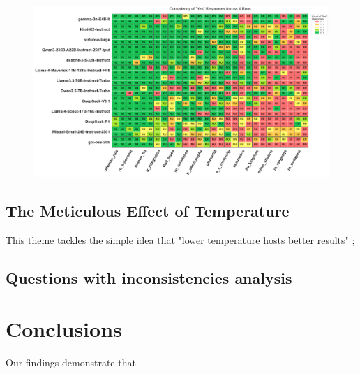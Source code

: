 \documentclass[11pt]{article}
\begin{document}
\begin{figure}[htbp]
    \centering
    \includegraphics[scale=0.5]{../analysis_reports/consistency_yesno_quadrant_map.png}
    \caption{}
    \label{fig:model_yesno_quadrants}
\end{figure}


\subsection{The Meticulous Effect of Temperature} %
This theme tackles the simple idea that "lower temperature hosts better results" \cite{li2025}; 



\subsection{Questions with inconsistencies analysis}  %



\section{Conclusions}
Our findings demonstrate that 

\newpage
\end{document}
